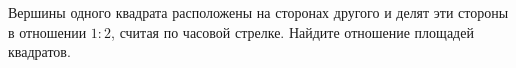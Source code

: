 \begin{ex}
	\begin{condition}
		Вершины одного квадрата расположены на сторонах другого и делят эти стороны в отношении \( 1 : 2 \), считая по часовой стрелке. Найдите отношение площадей квадратов.
	\end{condition}
\end{ex}
